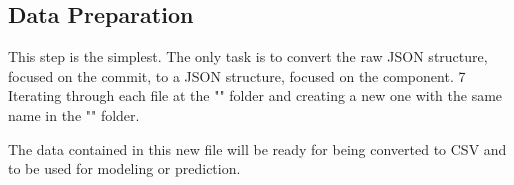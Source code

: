 

\subsection{Data Preparation}

This step is the simplest. The only task is to convert the raw JSON structure, focused on the commit, to a JSON structure, focused on the component. 7
Iterating through each file at the "" folder and creating a new one with the same name in the "" folder.

The data contained in this new file will be ready for being converted to CSV and to be used for modeling or prediction.

